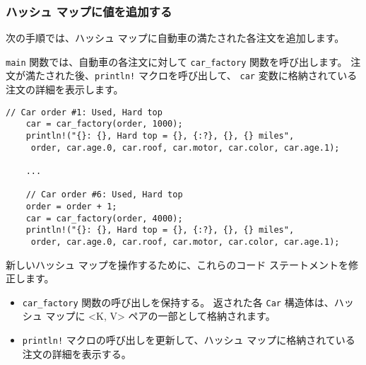 \subsubsection{ハッシュ マップに値を追加する}

次の手順では、ハッシュ マップに自動車の満たされた各注文を追加します。

\texttt{main} 関数では、自動車の各注文に対して \texttt{car_factory} 関数を呼び出します。 注文が満たされた後、\texttt{println!} マクロを呼び出して、 \texttt{car} 変数に格納されている注文の詳細を表示します。

\begin{lstlisting}[numbers=none]
    // Car order #1: Used, Hard top
    car = car_factory(order, 1000);
    println!("{}: {}, Hard top = {}, {:?}, {}, {} miles",
     order, car.age.0, car.roof, car.motor, car.color, car.age.1);

    ...

    // Car order #6: Used, Hard top
    order = order + 1;
    car = car_factory(order, 4000);
    println!("{}: {}, Hard top = {}, {:?}, {}, {} miles",
     order, car.age.0, car.roof, car.motor, car.color, car.age.1);
\end{lstlisting}

新しいハッシュ マップを操作するために、これらのコード ステートメントを修正します。

\begin{itemize}

\item \texttt{car_factory} 関数の呼び出しを保持する。 返された各 \texttt{Car} 構造体は、ハッシュ マップに <K, V> ペアの一部として格納されます。

\item \texttt{println!} マクロの呼び出しを更新して、ハッシュ マップに格納されている注文の詳細を表示する。

\end{itemize}

